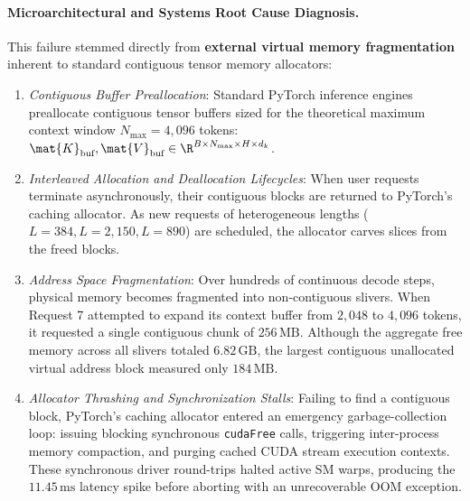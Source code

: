\paragraph{Microarchitectural and Systems Root Cause Diagnosis.}
This failure stemmed directly from \textbf{external virtual memory fragmentation} inherent to standard contiguous tensor memory allocators:
\begin{enumerate}
    \item \emph{Contiguous Buffer Preallocation}: Standard PyTorch inference engines preallocate contiguous tensor buffers sized for the theoretical maximum context window $N_{\max} = 4{,}096$ tokens: $\mat{K}_{\text{buf}}, \mat{V}_{\text{buf}} \in \R^{B \times N_{\max} \times H \times d_k}$.
    \item \emph{Interleaved Allocation and Deallocation Lifecycles}: When user requests terminate asynchronously, their contiguous blocks are returned to PyTorch's caching allocator. As new requests of heterogeneous lengths ($L=384, L=2{,}150, L=890$) are scheduled, the allocator carves slices from the freed blocks.
    \item \emph{Address Space Fragmentation}: Over hundreds of continuous decode steps, physical memory becomes fragmented into non-contiguous slivers. When Request 7 attempted to expand its context buffer from $2{,}048$ to $4{,}096$ tokens, it requested a single contiguous chunk of $256\,\text{MB}$. Although the aggregate free memory across all slivers totaled $6.82\,\text{GB}$, the largest contiguous unallocated virtual address block measured only $184\,\text{MB}$.
    \item \emph{Allocator Thrashing and Synchronization Stalls}: Failing to find a contiguous block, PyTorch's caching allocator entered an emergency garbage-collection loop: issuing blocking synchronous \texttt{cudaFree} calls, triggering inter-process memory compaction, and purging cached CUDA stream execution contexts. These synchronous driver round-trips halted active SM warps, producing the $11.45\,\text{ms}$ latency spike before aborting with an unrecoverable OOM exception.
\end{enumerate}

